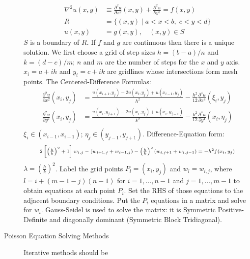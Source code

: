 \documentclass[8pt]{article}
\begin{document}
\begin{multicols}{2}
\begin{description}
\begin{equation*}
\begin{aligned}
        \nabla^2u(x,y)&\equiv\frac{\partial^2u}{\partial
          x^2}(x,y)+\frac{\partial^2u}{\partial y^2}=f(x,y) \\
        R &= \{(x,y) \mid a<x<b,\;c<y<d\} \\
        u(x,y) &= g(x,y),\quad (x,y) \in S
      \end{aligned}
    \end{equation*}
    $S$ is a boundary of $R$. If $f$ and $g$ are continuous then there
    is a unique solution.  We first choose a grid of step sizes
    $h=(b-a)/n$ and $k=(d-c)/m$; $n$ and $m$ are the number of steps
    for the $x$ and $y$ axis. $x_i=a+ih$ and $y_i=c+ik$ are gridlines
    whose intersections form mesh points. The Centered-Difference
    Formulas:
    \begin{equation*}
      \begin{aligned}
        \frac{\partial^2u}{\partial x^2}(x_i,y_j) &=
        \frac{u(x_{i+1},y_{j})-2u(x_{i},y_{j}) + u(x_{i-1},y_{j})}{h^2} -
        \frac{h^2}{12}\frac{\partial^4u}{\partial x^4}(\xi_i,y_j) \\
        \frac{\partial^2u}{\partial y^2}(x_i,y_j) &=
        \frac{u(x_{i},y_{j+1})-2u(x_{i},y_{j}) + u(x_{i},y_{j-1})}{k^2} -
        \frac{k^2}{12}\frac{\partial^4u}{\partial y^4}(x_i,\eta_j) \\
      \end{aligned}
    \end{equation*}
    $\xi_i \in (x_{i-1},x_{i+1})$; $\eta_j \in (y_{j-1},y_{j+1})$.
    Difference-Equation form:
    \begin{equation*}
      \scriptsize{
        \begin{array}{c}
          2\left[\left(\frac{h}{k}\right)^2+1\right]w_{i,j}-(w_{i+1,j}+w_{i-1,j})
          - \left(\frac{h}{k}\right)^2(w_{i,j+1}+w_{i,j-1})=-h^2f(x_i,y_j)
        \end{array}}
    \end{equation*}
    $\lambda = \left(\frac{h}{k}\right)^2$. Label the grid points
    $P_l=(x_i,y_j)$ and $w_l=w_{i,j}$, where $l=i+(m-1-j)(n-1)$ for
    $i=1,\ldots,n-1$ and $j=1,\ldots,m-1$ to obtain equations at each
    point $P_i$. Set the RHS of those equations to the adjacent
    boundary conditions. Put the $P_i$ equations in a matrix and solve
    for $w_i$. Gauss-Seidel is used to solve the matrix: it is
    Symmetric Positive-Definite and diagonally dominant (Symmetric
    Block Tridiagonal).
  \item[Poisson Equation Solving Methods] Iterative methods should be

\end{description}
\end{multicols}
\end{document}
